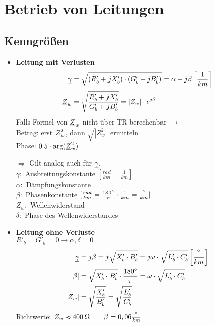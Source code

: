 \section{Betrieb von Leitungen}
\subsection{Kenngrößen}

\begin{itemize}
    \item[] \textbf{Leitung mit Verlusten}
    \begin{align*}
        \underline{\gamma} &= \sqrt{(R'_b +jX'_b)\cdot(G'_b+jB'_b)} = \alpha + j \beta \left[\frac{1}{km} \right]\\
        \underline{Z}_w &= \sqrt{\dfrac{R'_b + jX'_b}{G'_b + jB'_b}}= |Z_w| \cdot e^{j\delta}
    \end{align*}
    \indent Falls Formel von $\underline{Z}_w$ nicht über TR berechenbar $\rightarrow$\\
    Betrag: erst $\underline{Z}_w^2$, dann $\sqrt{|Z_w^2|}$ ermitteln \\
    Phase: $0.5 \cdot \arg(\underline{Z}_w^2)$

    $\Rightarrow$ Gilt analog auch für $\underline{\gamma}$.\\

    \indent $\gamma:$ Ausbreitungskonstante $[\frac{rad}{km} = \frac{1}{km}]$\\
    \indent $\alpha:$ Dämpfungskonstante\\
    \indent $\beta:$ Phasenkonstante $[\frac{rad}{km} = \frac{180\degree}{\pi} \cdot \frac{1}{km} = \frac{\degree}{km}]$\\
    \indent $Z_w:$ Wellenwiderstand\\
    \indent $\delta:$ Phase des Wellenwiderstandes\\

    \item[] \textbf{Leitung ohne Verluste}\\
            $R'_b = G'_b = 0\rightarrow \alpha, \delta = 0$
        \begin{align*}
            \underline{\gamma} &= j \beta = j \sqrt{X'_b \cdot B'_b} = j \omega \cdot \sqrt{L'_b \cdot C'_b}\left[\frac{\degree}{km} \right]\\
            |\beta| &= \sqrt{X'_b \cdot B'_b} \cdot \frac{180\degree}{\pi} = \omega \cdot \sqrt{L'_b \cdot C'_b} \\
            |Z_w| &= \sqrt{ \dfrac{X'_b}{B'_b} } = \sqrt{ \dfrac{L'_b}{C'_b} }
        \end{align*}
    Richtwerte:
            $Z_w \approx 400\: \ohm \qquad \beta = 0,06\frac{\degree}{km}$\\


\end{itemize}

